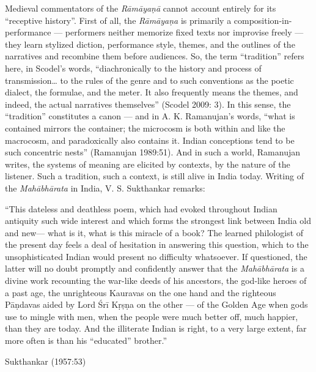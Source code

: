 Medieval commentators of the {\sl Rāmāyaṇā} cannot account entirely for its “receptive history”. First of all, the {\sl Rāmāyaṇa} is primarily a composition-in-performance --- performers neither memorize fixed texts nor improvise freely --- they learn stylized diction, performance style, themes, and the outlines of the narratives and recombine them before audiences.  So, the term “tradition” refers here, in Scodel’s words, “diachronically to the history and process of transmission… to the rules of the genre and to such conventions as the poetic dialect, the formulae, and the meter. It also frequently means the themes, and indeed, the actual narratives themselves” (Scodel 2009: 3). In this sense, the “tradition” constitutes a canon --- and in A. K. Ramanujan’s words, “what is contained mirrors the container; the microcosm is both within and like the macrocosm, and paradoxically also contains it. Indian conceptions tend to be such concentric nests” (Ramanujan 1989:51). And in such a world, Ramanujan writes, the systems of meaning are elicited by contexts, by the nature of the listener. Such a tradition, such a context, is still alive in India today. Writing of the {\sl Mahābhārata} in India, V. S. Sukthankar remarks:

\begin{myquote}
“This dateless and deathless poem, which had evoked throughout Indian antiquity such wide interest and which forms the strongest link between India old and new--- what is it, what is this miracle of a book? The learned philologist of the present day feels a deal of hesitation in answering this question, which to the unsophisticated Indian would present no difficulty whatsoever. If questioned, the latter will no doubt promptly and confidently answer that the {\sl Mahābhārata} is a divine work recounting the war-like deeds of his ancestors, the god-like heroes of a past age, the unrighteous Kauravas on the one hand and the righteous Pāṇdavas aided by Lord Śrī Kṛṣṇa on the other --- of the Golden Age when gods use to mingle with men, when the people were much better off, much happier, than they are today. And the illiterate Indian is right, to a very large extent, far more often is than his “educated” brother.” 

\hfill	Sukthankar (1957:53)
\end{myquote}

